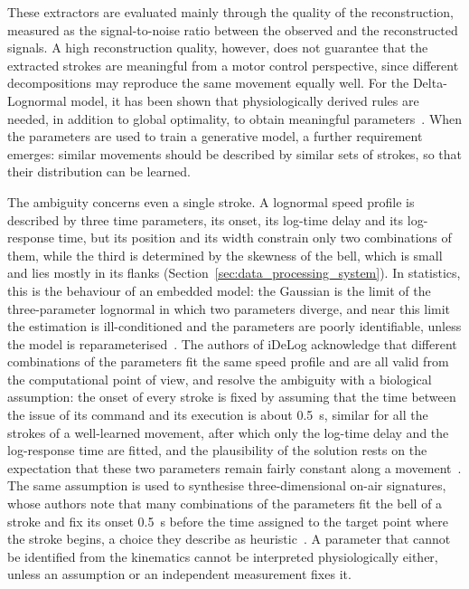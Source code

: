 \documentclass[12pt]{report}
\begin{document}
These extractors are evaluated mainly through the quality of the reconstruction, measured as the signal-to-noise ratio between the observed and the reconstructed signals. A high reconstruction quality, however, does not guarantee that the extracted strokes are meaningful from a motor control perspective, since different decompositions may reproduce the same movement equally well. For the Delta-Lognormal model, it has been shown that physiologically derived rules are needed, in addition to global optimality, to obtain meaningful parameters~\cite{oreilly2012}. When the parameters are used to train a generative model, a further requirement emerges: similar movements should be described by similar sets of strokes, so that their distribution can be learned.

The ambiguity concerns even a single stroke. A lognormal speed profile is described by three time parameters, its onset, its log-time delay and its log-response time, but its position and its width constrain only two combinations of them, while the third is determined by the skewness of the bell, which is small and lies mostly in its flanks (Section~\ref{sec:data_processing_system}). In statistics, this is the behaviour of an embedded model: the Gaussian is the limit of the three-parameter lognormal in which two parameters diverge, and near this limit the estimation is ill-conditioned and the parameters are poorly identifiable, unless the model is reparameterised~\cite{cheng1990embedded,cheng1992embedded}. The authors of iDeLog acknowledge that different combinations of the parameters fit the same speed profile and are all valid from the computational point of view, and resolve the ambiguity with a biological assumption: the onset of every stroke is fixed by assuming that the time between the issue of its command and its execution is about 0.5~s, similar for all the strokes of a well-learned movement, after which only the log-time delay and the log-response time are fitted, and the plausibility of the solution rests on the expectation that these two parameters remain fairly constant along a movement~\cite[Sec.~III-B]{idelog}. The same assumption is used to synthesise three-dimensional on-air signatures, whose authors note that many combinations of the parameters fit the bell of a stroke and fix its onset 0.5~s before the time assigned to the target point where the stroke begins, a choice they describe as heuristic~\cite[Sec.~2.2.2]{ferrer2023onair}. A parameter that cannot be identified from the kinematics cannot be interpreted physiologically either, unless an assumption or an independent measurement fixes it.
\end{document}
